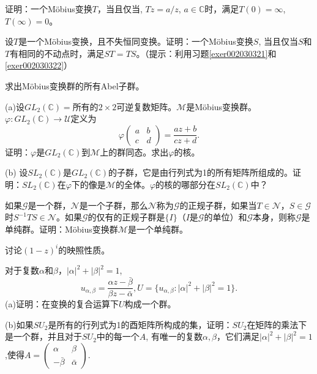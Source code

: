 \begin{problemset}
\item 证明：一个M\"obius变换$T$，当且仅当, $Tz = a/z$, $a \in \mathbb{C}$时，满足$T(0) = \infty$, $T(\infty) = 0$。

\item 设$T$是一个M\"obius变换，且不失恒同变换。证明：一个M\"obius变换$S$, 当且仅当$S$和$T$有相同的不动点时，满足$ST=TS$。（提示：利用习题\ref{exer002030321}和\ref{exer002030322}）

\item 求出M\"obius变换群的所有Abel子群。

\item (a)设$GL_2(\mathbb{C})=$所有的$2 \times 2$可逆复数矩阵。$\mathscr{M}$是M\"obius变换群。$\varphi: GL_2(\mathbb{C}) \to \mathscr{U}$定义为
\[
\varphi\begin{pmatrix}a & b \\ c & d\end{pmatrix} = \frac{az+b}{cz+d}.
\]
证明：$\varphi$是$GL_2(\mathbb{C})$到$\mathscr{M}$上的群同态。求出$\varphi$的核。

(b) 设$SL_2(\mathbb{C})$是$GL_2(\mathbb{C})$的子群，它是由行列式为1的所有矩阵所组成的。证明：$SL_2(\mathbb{C})$在$\varphi$下的像是$\mathscr{M}$的全体。$\varphi$的核的哪部分在$SL_2(\mathbb{C})$中？

\item 如果$\mathscr{G}$是一个群，$\mathscr{N}$是一个子群，那么$\mathscr{N}$称为$\mathscr{G}$的正规子群，如果当$T \in \mathscr{N}$，$S \in \mathscr{G}$时$S^{-1}TS \in \mathscr{N}$。如果$\mathscr{G}$的仅有的正规子群是$\{I\}$（$I$是$\mathscr{G}$的单位）和$\mathscr{G}$本身，则称$\mathscr{G}$是单纯群。证明：M\"obius变换群$\mathscr{M}$是一个单纯群。

\item 讨论$(1-z)^i$的映照性质。

\item 对于复数$\alpha$和$\beta$，$|\alpha|^2 + |\beta|^2 = 1$,
\[
u_{\alpha,\beta} = \frac{\alpha{}z - \bar{\beta}}{\beta{}z - \bar{\alpha}}, U = \{u_{\alpha,\beta}:|\alpha|^2+|\beta|^2=1\}.
\]
(a)证明：在变换的复合运算下$U$构成一个群。

(b)如果$SU_2$是所有的行列式为1的酉矩阵所构成的集，证明：$SU_2$在矩阵的乘法下是一个群，并且对于$SU_2$中的每一个$A$, 有唯一的复数$\alpha,\beta$，它们满足$|\alpha|^2+|\beta|^2=1$,使得$A = \begin{pmatrix}\alpha & \beta \\ -\bar{\beta} & \bar{\alpha}\end{pmatrix}$.


\end{problemset}
